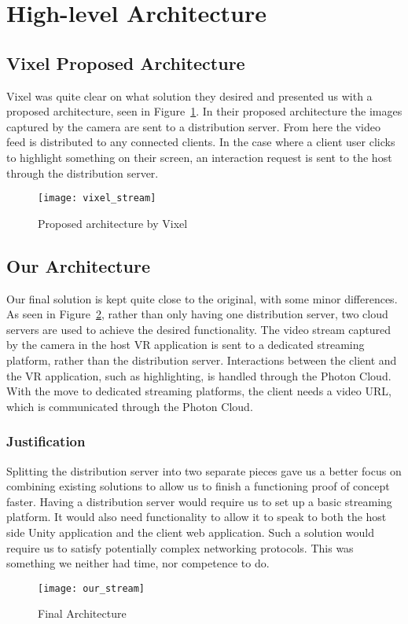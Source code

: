 \section{High-level Architecture}
\subsection{Vixel Proposed Architecture}
Vixel was quite clear on what solution they desired and presented us with a proposed architecture, seen in Figure~\ref{fig:proposed_architecture}. In their proposed architecture the images captured by the camera are sent to a distribution server. From here the video feed is distributed to any connected clients.
In the case where a client user clicks to highlight something on their screen, an interaction request is sent to the host through the distribution server.

\begin{figure}
    \centering
    \texttt{[image: vixel\_stream]}
    \caption{Proposed architecture by Vixel}
    \label{fig:proposed_architecture}
\end{figure}

\subsection{Our Architecture}
Our final solution is kept quite close to the original, with some minor differences. As seen in Figure~\ref{fig:our_architecture}, rather than only having one distribution server, two cloud servers are used to achieve the desired functionality. The video stream captured by the camera in the host VR application is sent to a dedicated streaming platform, rather than the distribution server. Interactions between the client and the VR application, such as highlighting, is handled through the Photon Cloud. With the move to dedicated streaming platforms, the client needs a video URL, which is communicated through the Photon Cloud.

\subsubsection{Justification}
Splitting the distribution server into two separate pieces gave us a better focus on combining existing solutions to allow us to finish a functioning proof of concept faster. Having a distribution server would require us to set up a basic streaming platform. It would also need functionality to allow it to speak to both the host side Unity application and the client web application. Such a solution would require us to satisfy potentially complex networking protocols. This was something we neither had time, nor competence to do.

\begin{figure}
    \centering
    \texttt{[image: our\_stream]}
    \caption{Final Architecture}
    \label{fig:our_architecture}
\end{figure}
